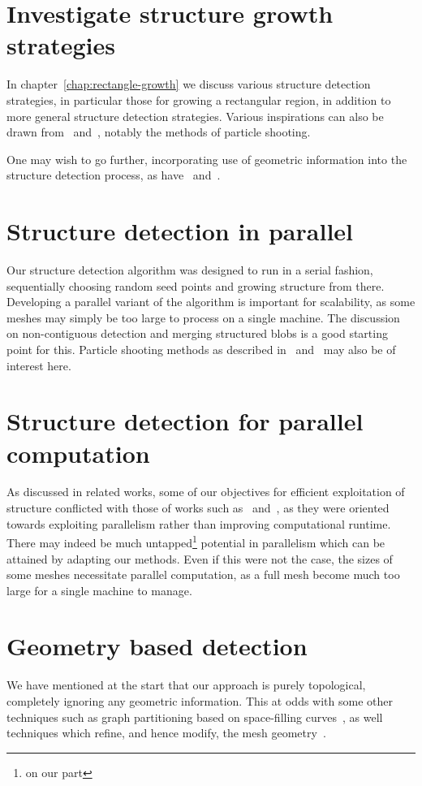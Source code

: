\section{Investigate structure growth strategies}
In chapter~\ref{chap:rectangle-growth} we discuss various structure detection strategies, in particular those for growing a rectangular region, in addition to more general structure detection strategies. Various inspirations can also be drawn from~\cite{eppstein2008motorcycle} and~\cite{eppstein2008approximate}, notably the methods of particle shooting.

One may wish to go further, incorporating use of geometric information into the structure detection process, as have~\cite{makem2012automatic} and~\cite{rocca2011fast}.


\section{Structure detection in parallel}
Our structure detection algorithm was designed to run in a serial fashion, sequentially choosing random seed points and growing structure from there. Developing a parallel variant of the algorithm is important for scalability, as some meshes may simply be too large to process on a single machine. The discussion on non-contiguous detection and merging structured blobs is a good starting point for this. Particle shooting methods as described in~\cite{eppstein2008motorcycle} and~\cite{eppstein2008approximate} may also be of interest here.



\section{Structure detection for parallel computation}
As discussed in related works, some of our objectives for efficient exploitation of structure conflicted with those of works such as~\cite{bergen2004hierarchical} and~\cite{li2004hierarchical}, as they were oriented towards exploiting parallelism rather than improving computational runtime. There may indeed be much untapped\footnote{on our part} potential in parallelism which can be attained by adapting our methods. Even if this were not the case, the sizes of some meshes necessitate parallel computation, as a full mesh become much too large for a single machine to manage.


\section{Geometry based detection}
We have mentioned at the start that our approach is purely topological, completely ignoring any geometric information. This at odds with some other techniques such as graph partitioning based on space-filling curves~\cite{ridley2010guide}, as well techniques which refine, and hence modify, the mesh geometry~\cite{bergen2004hierarchical}.

